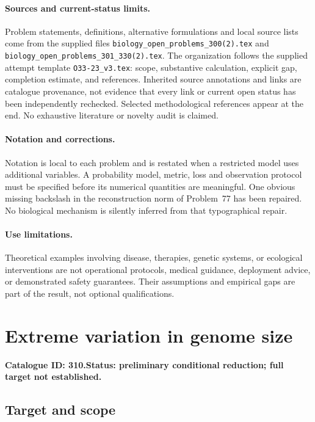 \documentclass[11pt]{article}
\begin{document}
\paragraph{Sources and current-status limits.}
Problem statements, definitions, alternative formulations and local source lists
come from the supplied files
\texttt{biology\_open\_problems\_300(2).tex} and
\texttt{biology\_open\_problems\_301\_330(2).tex}.
The organization follows the supplied attempt template
\texttt{O33-23\_v3.tex}: scope, substantive calculation, explicit gap,
completion estimate, and references. Inherited source annotations and links are
catalogue provenance, not evidence that every link or current open status has
been independently rechecked. Selected methodological references appear at the
end. No exhaustive literature or novelty audit is claimed.

\paragraph{Notation and corrections.}
Notation is local to each problem and is restated when a restricted model uses
additional variables. A probability model, metric, loss and observation protocol
must be specified before its numerical quantities are meaningful. One obvious
missing backslash in the reconstruction norm of Problem~77 has been repaired.
No biological mechanism is silently inferred from that typographical repair.

\paragraph{Use limitations.}
Theoretical examples involving disease, therapies, genetic systems, or ecological
interventions are not operational protocols, medical guidance, deployment advice,
or demonstrated safety guarantees. Their assumptions and empirical gaps are part
of the result, not optional qualifications.

\setcounter{section}{309}
\section{Extreme variation in genome size}
\label{prob:310}
\noindent\textbf{Catalogue ID: 310.}\quad \textbf{Status: preliminary conditional reduction; full target not established.}
\subsection{Target and scope}
\end{document}
